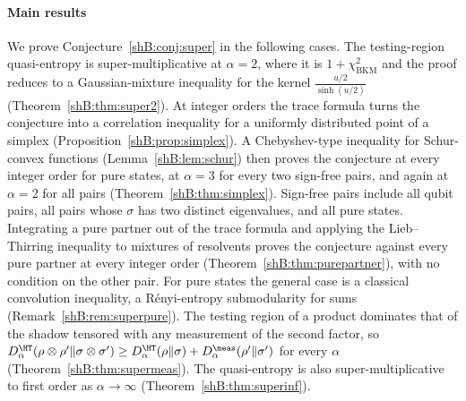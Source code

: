 \paragraph{Main results}
We prove Conjecture~\ref{shB:conj:super} in the following cases. The testing-region quasi-entropy is super-multiplicative at $\alpha=2$, where it is $1+\chi^2_{\mathrm{BKM}}$ and the proof reduces to a Gaussian-mixture inequality for the kernel $\frac{u/2}{\sinh(u/2)}$ (Theorem~\ref{shB:thm:super2}). At integer orders the trace formula turns the conjecture into a correlation inequality for a uniformly distributed point of a simplex (Proposition~\ref{shB:prop:simplex}). A Chebyshev-type inequality for Schur-convex functions (Lemma~\ref{shB:lem:schur}) then proves the conjecture at every integer order for pure states, at $\alpha=3$ for every two sign-free pairs, and again at $\alpha=2$ for all pairs (Theorem~\ref{shB:thm:simplex}). Sign-free pairs include all qubit pairs, all pairs whose $\sigma$ has two distinct eigenvalues, and all pure states. Integrating a pure partner out of the trace formula and applying the Lieb--Thirring inequality to mixtures of resolvents proves the conjecture against every pure partner at every integer order (Theorem~\ref{shB:thm:purepartner}), with no condition on the other pair. For pure states the general case is a classical convolution inequality, a R\'enyi-entropy submodularity for sums (Remark~\ref{shB:rem:superpure}). The testing region of a product dominates that of the shadow tensored with any measurement of the second factor, so $D^\HT_\alpha(\rho\otimes\rho'\|\sigma\otimes\sigma')\ge D^\HT_\alpha(\rho\|\sigma)+D^\meas_\alpha(\rho'\|\sigma')$ for every $\alpha$ (Theorem~\ref{shB:thm:supermeas}). The quasi-entropy is also super-multiplicative to first order as $\alpha\to\infty$ (Theorem~\ref{shB:thm:superinf}).

